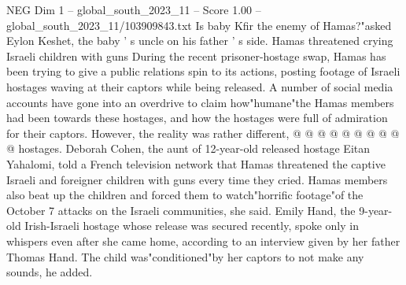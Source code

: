 \begin{textsample}{NEG Dim 1 – global\_south\_2023\_11 – Score 1.00 – global\_south\_2023\_11/103909843.txt}
Is baby Kfir the enemy of Hamas?"asked Eylon Keshet, the baby ' s uncle on his father ' s side.
Hamas threatened crying Israeli children with guns During the recent prisoner-hostage swap, Hamas has been trying to give a public relations spin to its actions, posting footage of Israeli hostages waving at their captors while being released.
A number of social media accounts have gone into an overdrive to claim how"humane"the Hamas members had been towards these hostages, and how the hostages were full of admiration for their captors.
However, the reality was rather different, @ @ @ @ @ @ @ @ @ @ hostages.
Deborah Cohen, the aunt of 12-year-old released hostage Eitan Yahalomi, told a French television network that Hamas threatened the captive Israeli and foreigner children with guns every time they cried.
Hamas members also beat up the children and forced them to watch"horrific footage"of the October 7 attacks on the Israeli communities, she said.
Emily Hand, the 9-year-old Irish-Israeli hostage whose release was secured recently, spoke only in whispers even after she came home, according to an interview given by her father Thomas Hand.
The child was"conditioned"by her captors to not make any sounds, he added.

\end{textsample}

